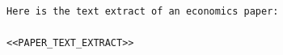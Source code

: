 \begin{tcolorbox}[title={Stage 1 User Prompt (Template)}, breakable]
\begin{verbatim}
Here is the text extract of an economics paper:

<<PAPER_TEXT_EXTRACT>>

\end{verbatim}
\end{tcolorbox}
